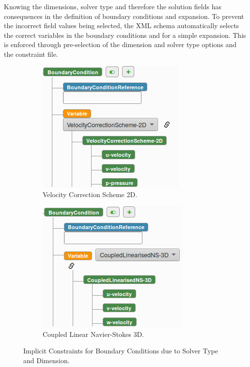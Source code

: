 \documentclass[11pt, a4paper]{report}
\begin{document}
Knowing the dimensions, solver type and therefore the solution fields has consequences in the definition of boundary conditions and expansion. To prevent the incorrect field values being selected, the XML schema automatically selects the correct variables in the boundary conditions and for a simple expansion. This is enforced through pre-selection of the dimension and solver type options and the constraint file.

\begin{figure}[!htb]
\centering
\begin{subfigure}{.5\textwidth}
  \centering
  \includegraphics[width=.9\linewidth]{VCS_2D}
  \caption{Velocity Correction Scheme 2D.}
  \label{fig:vcs2d}
\end{subfigure}%
\begin{subfigure}{.5\textwidth}
  \centering
  \includegraphics[width=.9\linewidth]{coupledLinear3D}
  \caption{Coupled Linear Navier-Stokes 3D.}
  \label{fig:coupledlinear3d}
\end{subfigure}
\caption{Implicit Constraints for Boundary Conditions due to Solver Type and Dimension.}
\label{fig:implicit_constraints}
\end{figure}
\end{document}
